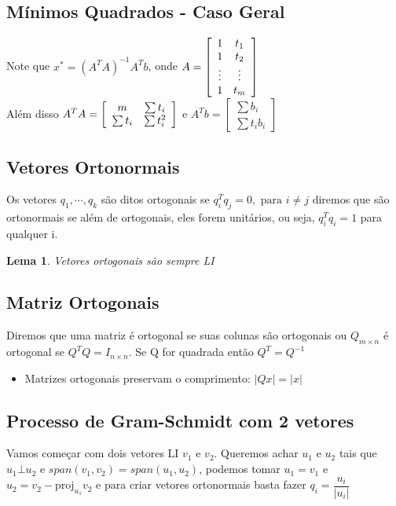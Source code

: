 \documentclass[12pt]{article}
\newtheorem{lemma}[theorem]{Lema}
\begin{document}
\subsection*{Mínimos Quadrados - Caso Geral}
Note que $x^* = (A^T A)^{-1} A^T b$, onde $A = \left[\begin{array}{c c} 1 & t_{1} \\ 1 & t_{2} \\ \vdots & \vdots \\ 1 & t_{m} \end{array} \right]$
\\
Além disso $A^T A = \left[ \begin{array}{c c} m & \sum t_i \\ \sum t_i & \sum t_i^2 \end{array} \right]$ e $A^T b = \left[ \begin{array}{c} \sum b_i \\ \sum t_i b_i \end{array} \right]$

\subsection*{Vetores Ortonormais}
Os vetores $q_1, \cdots, q_k$ são ditos ortogonais se $q_i^T q_j = 0, \text{ para } i \neq j$ diremos que são ortonormais se além de ortogonais, eles forem unitários, ou seja, $q_i^T q_i = 1$ para qualquer i.

\begin{lemma}
Vetores ortogonais são sempre LI
\end{lemma}

\subsection*{Matriz Ortogonais}
Diremos que uma matriz é ortogonal se suas colunas são ortogonais ou $Q_{m \times n}$ é ortogonal se $Q^T Q = I_{n \times n}$. Se Q for quadrada então $Q^T = Q^{-1}$

\begin{itemize}
    \item Matrizes ortogonais preservam o comprimento: $|Qx| = |x|$
\end{itemize}

\subsection*{Processo de Gram-Schmidt com 2 vetores}
Vamos começar com dois vetores LI $v_1$ e $v_2$. Queremos achar $u_1$ e $u_2$ tais que $u_1 \bot u_2$ e $span({v_1, v_2}) = span({u_1, u_2})$, podemos tomar $u_1 = v_1$ e $u_2 = v_2 - \text{proj}_{u_1} v_2$ e para criar vetores ortonormais basta fazer $q_i = \dfrac{u_i}{|u_i|}$
\end{document}
